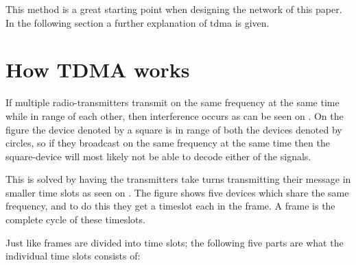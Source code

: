 This method is a great starting point when designing the network of this paper.
In the following section a further explanation of \gls{tdma} is given.

\section{How TDMA works}

If multiple radio-transmitters transmit on the same frequency at the same time while in range of each other, then interference occurs as can be seen on . 
On the figure the device denoted by a square is in range of both the devices denoted by circles, so if they broadcast on the same frequency at the same time then the square-device will most likely not be able to decode either of the signals.\cite{networkencyclopedia2013time, networkencyclopedia2013advanced}



This is solved by having the transmitters take turns transmitting their message in smaller time slots as seen on .
The figure shows five devices which share the same frequency, and to do this they get a timeslot each in the frame.
A frame is the complete cycle of these timeslots.


\noindent
Just like frames are divided into time slots; the following five parts are what the individual time slots consists of:

